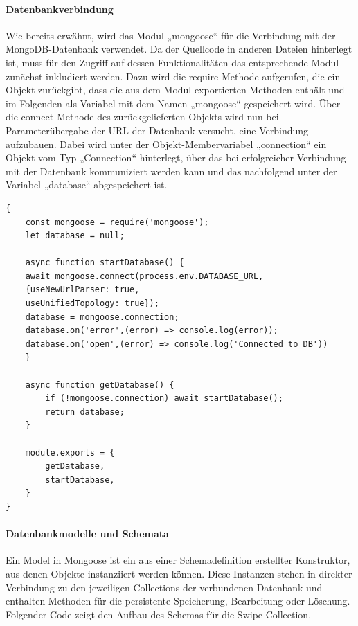 \paragraph{Datenbankverbindung}
Wie bereits erwähnt, wird das Modul „mongoose“ für die Verbindung mit der MongoDB-Datenbank verwendet. 
Da der Quellcode in anderen Dateien hinterlegt ist, muss für den Zugriff auf dessen Funktionalitäten das entsprechende Modul zunächst inkludiert werden. Dazu wird die require-Methode aufgerufen, die ein Objekt zurückgibt, dass die aus dem Modul exportierten Methoden enthält und im Folgenden als Variabel mit dem Namen „mongoose“ gespeichert wird. 
\newline
Über die connect-Methode des zurückgelieferten Objekts wird nun bei Parameterübergabe der URL der Datenbank versucht, eine Verbindung aufzubauen.  
Dabei wird unter der Objekt-Membervariabel  „connection“ ein Objekt vom Typ „Connection“ hinterlegt, über das bei erfolgreicher Verbindung mit der Datenbank kommuniziert werden kann und das nachfolgend unter der Variabel „database“ abgespeichert ist. 

\begin{lstlisting}[caption=Verbindung zur MongoDB-Datenbank, label=lst:mongodbconnection]
 {
 	const mongoose = require('mongoose');
	let database = null;

	async function startDatabase() {
	await mongoose.connect(process.env.DATABASE_URL, 
	{useNewUrlParser: true,
	useUnifiedTopology: true}); 
  	database = mongoose.connection;
  	database.on('error',(error) => console.log(error));
  	database.on('open',(error) => console.log('Connected to DB'))
	}

	async function getDatabase() {
 	 	if (!mongoose.connection) await startDatabase();
  		return database;
	}

	module.exports = {
  		getDatabase,
  		startDatabase,
	}
}
\end{lstlisting}

\paragraph{Datenbankmodelle und Schemata}

Ein Model in Mongoose ist ein aus einer Schemadefinition erstellter Konstruktor, aus denen Objekte instanziiert werden können. Diese Instanzen stehen in direkter Verbindung zu den jeweiligen Collections der verbundenen Datenbank und enthalten Methoden für die persistente Speicherung, Bearbeitung oder Löschung.
\newline
Folgender Code zeigt den Aufbau des Schemas für die Swipe-Collection. 

